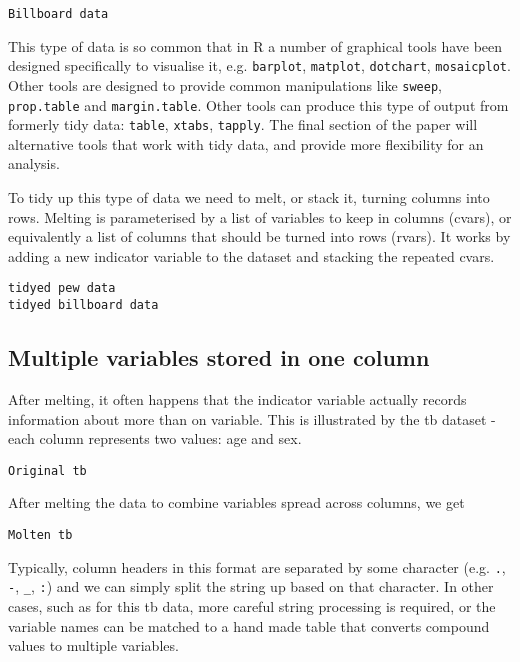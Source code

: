 \documentclass[oneside]{article}
\begin{document}
\begin{verbatim}
Billboard data
\end{verbatim}

This type of data is so common that in R a number of graphical tools have been designed specifically to visualise it, e.g. \texttt{barplot}, \texttt{matplot}, \texttt{dotchart}, \texttt{mosaicplot}. Other tools are designed to provide common manipulations like \texttt{sweep}, \texttt{prop.table} and \texttt{margin.table}. Other tools can produce this type of output from formerly tidy data: \texttt{table}, \texttt{xtabs}, \texttt{tapply}. The final section of the paper will alternative tools that work with tidy data, and provide more flexibility for an analysis.

To tidy up this type of data we need to melt, or stack it, turning columns into rows. Melting is parameterised by a list of variables to keep in columns (cvars), or equivalently a list of columns that should be turned into rows (rvars). It works by adding a new indicator variable to the dataset and stacking the repeated cvars.

\begin{verbatim}
tidyed pew data
tidyed billboard data
\end{verbatim}

\subsection{Multiple variables stored in one column}

After melting, it often happens that the indicator variable actually records information about more than on variable. This is illustrated by the tb dataset - each column represents two values: age and sex.  

\begin{verbatim}
Original tb
\end{verbatim}

After melting the data to combine variables spread across columns, we get

\begin{verbatim}
Molten tb
\end{verbatim}

Typically, column headers in this format are separated by some character (e.g. \texttt{.}, \texttt{-}, \texttt{\_}, \texttt{:}) and we can simply split the string up based on that character.  In other cases, such as for this tb data, more careful string processing is required, or the variable names can be matched to a hand made table that converts compound values to multiple variables.
\end{document}
